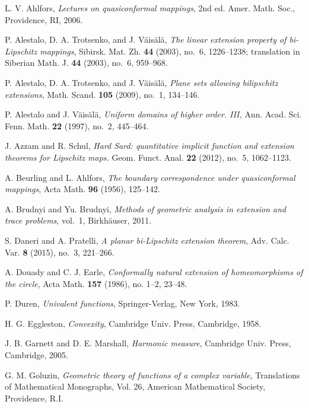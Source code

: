 \documentclass[11pt]{amsart}
\theoremstyle{remark}
\numberwithin{equation}{section}
\begin{document}
 

\begin{thebibliography}{10}

L. V. Ahlfors, \textit{Lectures on quasiconformal mappings},
2nd ed. Amer. Math. Soc., Providence, RI, 2006.

P. Alestalo, D. A. Trotsenko, and J. V\"ais\"al\"a, 
\textit{The linear extension property of bi-Lipschitz mappings}, 
Sibirsk. Mat. Zh. \textbf{44} (2003), no.~6, 1226--1238; translation in Siberian Math. J. \textbf{44} (2003), no.~6, 959--968.

P. Alestalo, D. A. Trotsenko, and J. V\"ais\"al\"a, 
\textit{Plane sets allowing bilipschitz extensions}, 
Math. Scand. \textbf{105} (2009), no.~1, 134--146. 

P. Alestalo and J. V\"ais\"al\"a, 
\textit{Uniform domains of higher order. III,}
Ann. Acad. Sci. Fenn. Math. \textbf{22} (1997), no.~2, 445--464. 

J. Azzam and R. Schul,
\textit{Hard Sard: quantitative implicit function and extension theorems for Lipschitz maps.}
Geom. Funct. Anal. \textbf{22} (2012), no.~5, 1062--1123. 

A. Beurling  and L. Ahlfors, \textit{The boundary correspondence under quasiconformal mappings},
Acta Math. {\bf 96} (1956), 125--142.

A. Brudnyi and Yu. Brudnyi,
\textit{Methods of geometric analysis in extension and trace problems}, vol.~1,
Birkh\"auser, 2011. 

S. Daneri and A. Pratelli, \textit{A planar bi-Lipschitz extension theorem},  
Adv. Calc. Var. \textbf{8} (2015), no.~3, 221--266.

A. Douady and C. J. Earle,
\textit{Conformally natural extension of homeomorphisms of the circle}, 
Acta Math. \textbf{157} (1986), no. 1--2, 23--48. 

P. Duren, 
\textit{Univalent functions}, Springer-Verlag, New York, 1983.

H. G. Eggleston,
\textit{Convexity},
Cambridge Univ. Press, Cambridge, 1958.

J. B. Garnett and D. E. Marshall,
\textit{Harmonic measure}, Cambridge Univ. Press, Cambridge, 2005.

G. M. Goluzin, 
\textit{Geometric theory of functions of a complex variable}, Translations of Mathematical Monographs, Vol. 26, American Mathematical Society, Providence, R.I. 


\end{thebibliography}
\end{document}
